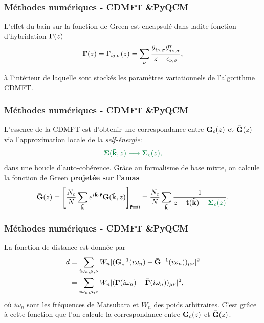 \begin{frame}
  \frametitle{Méthodes numériques - CDMFT \&\;PyQCM}
  L'effet du bain sur la fonction de Green est encapsulé dans ladite
  \textcolor{hard_green}{fonction d'hybridation $\vb{\Gamma}(z)$}
  \vspace{1cm}
  \begin{align}
    \vb{\Gamma}(z) = \Gamma_{ij,\sigma}(z) = \sum_\nu\frac{\theta_{i\nu,\sigma}\theta^*_{j\nu,\sigma}}{z - \epsilon_{\nu,\sigma}},
    \label{eq: hybridization}
  \end{align}
  \vspace{1cm}

  à l'intérieur de laquelle sont stockés les paramètres variationnels de l'algorithme CDMFT.
\end{frame}

\begin{frame}
  \frametitle{Méthodes numériques - CDMFT \&\;PyQCM}
    L'essence de la CDMFT est d'obtenir une correspondance entre
    $\vb{G}_c(z)$ et $\vb{\Bar{G}}(z)$ via \textcolor{hard_green}{l'approximation locale de la \textit{self-énergie}:}
    \begin{align}
        \textcolor{hard_green}
        {\vb{\Sigma}(\vb{\tilde{k}}, z)\longrightarrow\vb{\Sigma}_c(z),}
    \end{align}
    dans une boucle d'auto-cohérence.
    \vfill
    \pause
    Grâce au formalisme de base mixte, on calcule la fonction de Green
    \textbf{projetée sur l'amas}
    \begin{align}
        \vb{\Bar{G}}(z) = \Bigg[\frac{N_c}{N}\sum_{\vb{\Tilde{k}}}e^{i\vb{\Tilde{k}}\cdot\vb{\Tilde{r}}}\vb{G}(\vb{\Tilde{k}}, z)\Bigg]_{\vb{\Tilde{r}}=0}
        = \frac{N_c}{N}\sum_{\vb{\tilde{k}}}\frac{1}{z - \vb{t}(\vb{\tilde{k}}) - \textcolor{hard_green}{\vb{\Sigma}_c(z)}}.
    \end{align}
\end{frame}

\begin{frame}
  \frametitle{Méthodes numériques - CDMFT \&\;PyQCM}
    La fonction de distance est donnée par
    \begin{align}
      d &= \sum_{i\omega_n, \mu, \nu}W_n|(\vb{G}_c^{-1}(i\omega_n) - \vb{\Bar{G}}^{-1}(i\omega_n))_{\mu\nu}|^2 \\
        &=\sum_{i\omega_n, \mu, \nu}W_n|(\vb{\Gamma}(i\omega_n) - \vb{\Bar{\Gamma}}(i\omega_n))_{\mu\nu}|^2,
        \label{eq: dist}
    \end{align}
    où $i\omega_n$ sont les fréquences de Matsubara et $W_n$ des poids arbitraires.
    C'est grâce à cette fonction que l'on calcule la correspondance entre $\vb{G}_c(z)$ et $\vb{\Bar{G}}(z)$.
\end{frame}

